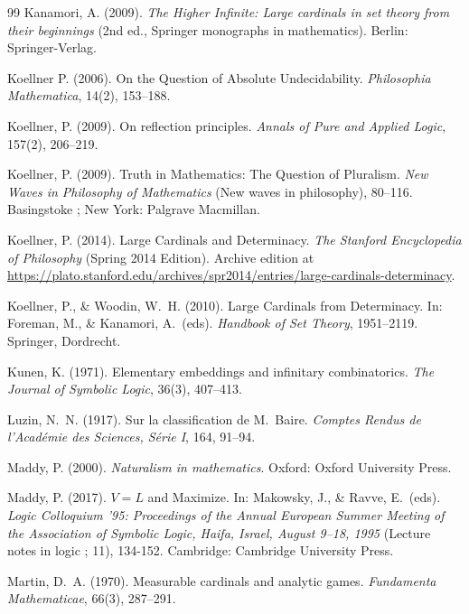 \documentclass[12pt]{article}
\theoremstyle{plain}
\theoremstyle{definition}
\begin{document}
\begin{thebibliography}{99}
	 Kanamori, A. (2009). \textit{The Higher Infinite: Large cardinals in set theory from their beginnings} (2nd ed., Springer monographs in mathematics). Berlin: Springer-Verlag.

	 Koellner P. (2006). On the Question of Absolute Undecidability. \textit{Philosophia Mathematica}, 14(2), 153--188.

	 Koellner, P. (2009). On reflection principles. \textit{Annals of Pure and Applied Logic}, 157(2), 206--219.

	 Koellner, P. (2009). Truth in Mathematics: The Question of Pluralism. \textit{New Waves in Philosophy of Mathematics} (New waves in philosophy), 80--116. Basingstoke ; New York: Palgrave Macmillan.

	 Koellner, P. (2014). Large Cardinals and Determinacy. \textit{The Stanford Encyclopedia of Philosophy} (Spring 2014 Edition). Archive edition at \url{https://plato.stanford.edu/archives/spr2014/entries/large-cardinals-determinacy}.

	 Koellner, P., \& Woodin, W.\ H. (2010). Large Cardinals from Determinacy. In: Foreman, M., \& Kanamori, A.\ (eds). \textit{Handbook of Set Theory}, 1951--2119. Springer, Dordrecht.

	 Kunen, K. (1971). Elementary embeddings and infinitary combinatorics. \textit{The Journal of Symbolic Logic}, 36(3), 407--413.

	 Luzin, N.\ N. (1917). Sur la classification de M.\ Baire. \textit{Comptes Rendus de l'Acad\'emie des Sciences, S\'erie I}, 164, 91--94.

	 Maddy, P. (2000). \textit{Naturalism in mathematics}. Oxford: Oxford University Press.

	 Maddy, P. (2017). $V = L$ and Maximize. In: Makowsky, J., \& Ravve, E.\ (eds). \textit{Logic Colloquium '95: Proceedings of the Annual European Summer Meeting of the Association of Symbolic Logic, Haifa, Israel, August 9--18, 1995} (Lecture notes in logic ; 11), 134-152. Cambridge: Cambridge University Press.

	 Martin, D.\ A. (1970). Measurable cardinals and analytic games. \textit{Fundamenta Mathematicae}, 66(3), 287--291.


\end{thebibliography}
\end{document}
